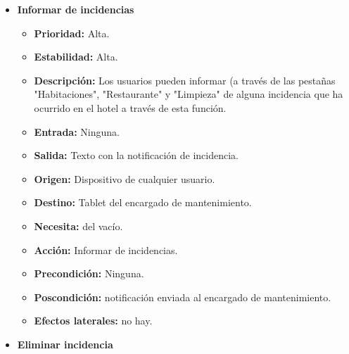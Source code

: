 \documentclass[spanish,a4paper,11pt, twoside]{report}	%
\begin{document}
\begin{itemize}
\begin{itemize}
		\end{itemize}%

\item \textbf{Informar de incidencias} %

		\begin{itemize}

			\item \textbf{Prioridad: }Alta.
			\item \textbf{Estabilidad: }Alta.
			\item \textbf{Descripción: }Los usuarios pueden informar (a través de las pestañas "Habitaciones", "Restaurante" y "Limpieza" de alguna incidencia que ha ocurrido en el hotel a través de esta función.
			\item \textbf{Entrada: }Ninguna.
			\item \textbf{Salida: }Texto con la notificación de incidencia.
			\item \textbf{Origen: }Dispositivo de cualquier usuario.
			\item \textbf{Destino: }Tablet del encargado de mantenimiento.
			\item \textbf{Necesita: }del vacío.
			\item \textbf{Acción: }Informar de incidencias.
			\item \textbf{Precondición: }Ninguna.
			\item \textbf{Poscondición: }notificación enviada al encargado de mantenimiento.
			\item \textbf{Efectos laterales: }no hay.

		\end{itemize}%

\item \textbf{Eliminar incidencia} %

		\begin{itemize}


\end{itemize}
\end{itemize}
\end{document}
